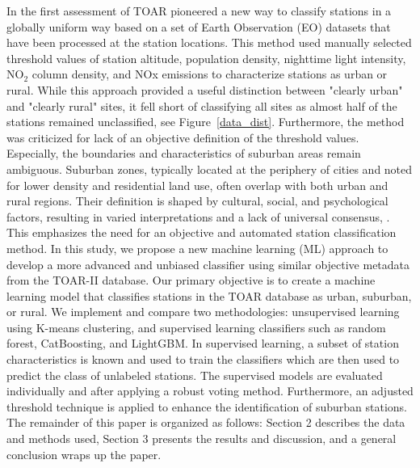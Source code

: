 \documentclass[gmd, manuscript]{copernicus}
\begin{document}

In the first assessment of TOAR \cite{schultz2017tropospheric} pioneered a new way to classify stations in a globally uniform way based on a set of Earth Observation (EO) datasets that have been processed at the station locations. This method used manually selected threshold values of station altitude, population density, nighttime light intensity, NO$_2$ column density, and NOx emissions to characterize stations as urban or rural. While this approach provided a useful distinction between "clearly urban" and "clearly rural" sites, it fell short of classifying all sites as almost half of the stations remained unclassified, see Figure~\ref{data_dist}. Furthermore, the method was criticized for lack of an objective definition of the threshold values. Especially, the boundaries and characteristics of suburban areas remain ambiguous. Suburban zones, typically located at the periphery of cities and noted for lower density and residential land use, often overlap with both urban and rural regions. Their definition is shaped by cultural, social, and psychological factors, resulting in varied interpretations and a lack of universal consensus, \citep{hesse2018suburbanisation, airgood2019defining}. This emphasizes the need for an objective and automated station classification method. In this study, we propose a new machine learning (ML) approach to develop a more advanced and unbiased classifier using similar objective metadata from the TOAR-II database. Our primary objective is to create a machine learning model that classifies stations in the TOAR database as urban, suburban, or rural.
We implement and compare two methodologies: unsupervised learning using K-means clustering, %
and supervised learning classifiers such as random forest, CatBoosting, and LightGBM. In supervised learning, a subset of station characteristics is known and used to train the classifiers which are then used to predict the class of unlabeled  stations. The supervised models are evaluated individually and after applying a robust voting method. Furthermore, an adjusted threshold technique is applied to enhance the identification of suburban stations. The remainder of this paper is organized as follows: Section 2 describes the data and methods used, Section 3 presents the results and discussion, and a general conclusion wraps up the paper.
\end{document}
